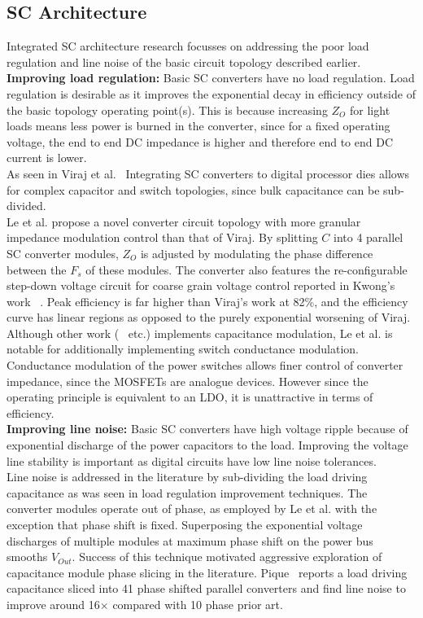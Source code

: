 \documentclass[letterpaper,twocolumn,10pt]{article}
\begin{document}
\subsection{SC Architecture}
Integrated SC architecture research focusses on addressing the poor load regulation and line noise of the basic circuit topology described earlier.\\
\textbf{Improving load regulation: }Basic SC converters have no load regulation. Load regulation is desirable as it improves the exponential decay in efficiency outside of the basic topology operating point(s). This is because increasing $Z_O$ for light loads means less power is burned in the converter, since for a fixed operating voltage, the end to end DC impedance is higher and therefore end to end DC current is lower.\\
\indent As seen in  Viraj et al.~\cite{Viraj2007} Integrating SC converters to digital processor dies allows for complex capacitor and switch topologies, since bulk capacitance can be sub-divided.\\
Le et al. \cite{Phuck2010} propose a novel converter circuit topology with more granular impedance modulation control than that of Viraj. By splitting $C$ into 4 parallel SC converter modules, $Z_O$ is adjusted by modulating the phase difference between the $F_s$ of these modules. The converter also features the re-configurable step-down voltage circuit for coarse grain voltage control reported in Kwong's work ~\cite{Kwong2009}. Peak efficiency is far higher than Viraj's work\cite{Viraj2007} at 82\%, and the efficiency curve has linear regions as opposed to the purely exponential worsening of Viraj.\\
Although other work (~\cite{Ramadass2010} etc.) implements capacitance modulation, Le et al. is notable for additionally implementing switch conductance modulation.\\
Conductance modulation of the power switches allows finer control of converter impedance, since the MOSFETs are analogue devices. However since the operating principle is equivalent to an LDO, it is unattractive in terms of efficiency.\\ 
\textbf{Improving line noise: }Basic SC converters have high voltage ripple because of exponential discharge of the power capacitors to the load. Improving the voltage line stability is important as digital circuits have low line noise tolerances.\\ 
Line noise is addressed in the literature by sub-dividing the load driving capacitance as was seen in load regulation improvement techniques. The converter modules operate out of phase, as employed by Le et al. \cite{Phuck2010} with the exception that phase shift is fixed. Superposing the exponential voltage discharges of multiple modules at maximum phase shift on the power bus smooths $V_{Out}$. Success of this technique motivated aggressive exploration of capacitance module phase slicing in the literature. Pique~\cite{Pique2012} reports a load driving capacitance sliced into 41 phase shifted parallel converters and find line noise to improve around 16$\times$ compared with 10 phase prior art.\\ 
\end{document}
